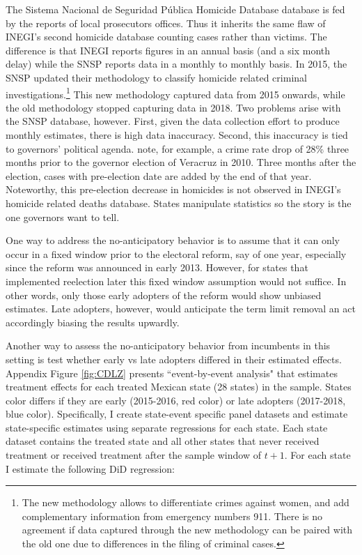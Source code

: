 \documentclass[12pt]{amsart}
\makeatletter
\def\section{\@startsection{section}{1}
	\z@{1.0\linespacing\@plus\linespacing}{.5\linespacing}{\Large}}
\numberwithin{equation}{section}
\theoremstyle{definition}
\theoremstyle{definition}
\theoremstyle{definition}
\makeatother
\begin{document}
\begin{appendix}
The Sistema Nacional de Seguridad P\'ublica Homicide Database database is fed by the reports of local prosecutors offices. Thus it inherits the same flaw of INEGI's second homicide database counting cases rather than victims. The difference is that INEGI reports figures in an annual basis (and a six month delay) while the SNSP reports data in a monthly to monthly basis. In 2015, the SNSP updated their methodology to classify homicide related criminal investigations.\footnote{The new methodology allows to differentiate crimes against women, and add complementary information from emergency numbers 911. There is no agreement if data captured through the new methodology can be paired with the old one due to differences in the filing of criminal cases.} This new methodology captured data from 2015 onwards, while the old methodology stopped capturing data in 2018. Two problems arise with the SNSP database, however. First, given the data collection effort to produce monthly estimates, there is high data inaccuracy. Second, this inaccuracy is tied to governors' political agenda. \citet{ch_rivera_2013} note, for example, a crime rate drop of 28\% three months prior to the governor election of Veracruz in 2010. Three months after the election, cases with pre-election date are added by the end of that year. Noteworthy, this pre-election decrease in homicides is not observed in INEGI's homicide related deaths database.  States manipulate statistics so the story is the one governors want to tell.
  
 \clearpage
 
\section{Validating the no-anticipatory assumption \label{appendix:CDLZ}}


One way to address the no-anticipatory behavior is to assume that it can only occur in a fixed window prior to the electoral reform, say of one year, especially since the reform was announced in early 2013. However, for states that implemented reelection later this fixed window assumption would not suffice. In other words, only those early adopters of the reform would show unbiased estimates. Late adopters, however, would anticipate the term limit removal an act accordingly biasing the results upwardly.  
 
Another way to assess the no-anticipatory behavior from incumbents in this setting is test whether early vs late adopters differed in their estimated effects. Appendix Figure \ref{fig:CDLZ} presents \citet{cengiz_etal_2019} ``event-by-event analysis" that estimates treatment effects for each treated Mexican state (28 states) in the sample. States color differs if they are early (2015-2016, red color) or late adopters (2017-2018, blue color). Specifically, I create state-event specific panel datasets and estimate state-specific estimates using separate regressions for each state. Each state dataset contains the treated state and all other states that never received treatment or received treatment after the sample window of $t+1$. For each state I estimate the following DiD regression: 


\end{appendix}
\end{document}
